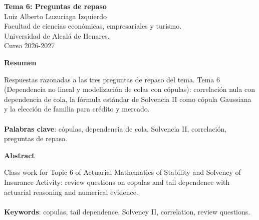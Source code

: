 \documentclass[a4paper,12pt]{article}
\begin{document}
\begin{titlepage}
    \centering
    \vspace*{0.1cm}
    \huge\textbf{Tema 6: Preguntas de repaso}\\
    \vspace{1cm}
    \small{Luiz Alberto Luzuriaga Izquierdo}\\
    \vspace{0.1cm}
    Facultad de ciencias económicas, empresariales y turismo. \\
    \vspace{0.1cm}
    Universidad de Alcalá de Henares. \\
    \vspace{0.1cm}
    Curso 2026-2027\\
    \vspace{0.5cm}

{\bfseries Resumen}

\vspace{0.1cm}
\noindent
\begin{justify}
Respuestas razonadas a las tres preguntas de repaso del tema. Tema 6 (Dependencia no lineal y modelización de colas con cópulas): correlación nula con dependencia de cola, la fórmula estándar de Solvencia II como cópula Gaussiana y la elección de familia para crédito y mercado.\\\\
\vspace{0.1cm}
\noindent
\textbf{Palabras clave}: cópulas, dependencia de cola, Solvencia II, correlación, preguntas de repaso.
\end{justify}
\begin{center}
    {\bfseries Abstract}
\end{center}
\vspace{0.1cm}
\noindent
\begin{justify}
Class work for Topic 6 of Actuarial Mathematics of Stability and Solvency of Insurance Activity: review questions on copulas and tail dependence with actuarial reasoning and numerical evidence.\\\\
\vspace{0.1cm}
\noindent
\textbf{Keywords}: copulas, tail dependence, Solvency II, correlation, review questions.
\end{justify}

\end{titlepage}

\newpage{}
\renewcommand{\contentsname}{Índice}
\tableofcontents
\end{document}
